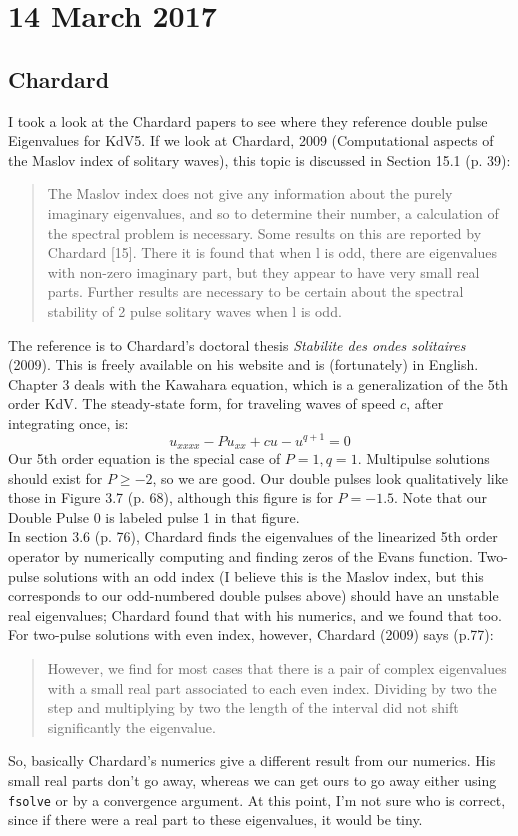 \documentclass[12pt]{article}
\begin{document}
\section*{14 March 2017}
\subsection*{Chardard}
I took a look at the Chardard papers to see where they reference double pulse Eigenvalues for KdV5. If we look at Chardard, 2009 (Computational aspects of the Maslov index of solitary waves), this topic is discussed in Section 15.1 (p. 39):
\begin{quote}
The Maslov index does not give any information about the purely imaginary eigenvalues, and so to determine their number, a calculation of the spectral problem is necessary. Some results on this are reported by Chardard [15]. There it is found that when l is odd, there are eigenvalues with non-zero imaginary part, but they appear to have very small real parts. Further results are necessary to be certain about the spectral stability of 2 pulse solitary waves when l is odd.
\end{quote}
The reference is to Chardard's doctoral thesis \textit{Stabilite des ondes solitaires} (2009). This is freely available on his website and is (fortunately) in English. Chapter 3 deals with the Kawahara equation, which is a generalization of the 5th order KdV. The steady-state form, for traveling waves of speed $c$, after integrating once, is:
\[
u_{xxxx} - Pu_{xx} + cu - u^{q+1} = 0
\]
Our 5th order equation is the special case of $P =1, q = 1$. Multipulse solutions should exist for $P \geq -2$, so we are good. Our double pulses look qualitatively like those in Figure 3.7 (p. 68), although this figure is for $P = -1.5$. Note that our Double Pulse 0 is labeled pulse 1 in that figure.\\

In section 3.6 (p. 76), Chardard finds the eigenvalues of the linearized 5th order operator by numerically computing and finding zeros of the Evans function. Two-pulse solutions with an odd index (I believe this is the Maslov index, but this corresponds to our odd-numbered double pulses above) should have an unstable real eigenvalues; Chardard found that with his numerics, and we found that too. For two-pulse solutions with even index, however, Chardard (2009) says (p.77):
\begin{quote}
However, we find for most cases that there is a pair of complex eigenvalues with a small real
part associated to each even index. Dividing by two the step and multiplying by two the length
of the interval did not shift significantly the eigenvalue.
\end{quote}
So, basically Chardard's numerics give a different result from our numerics. His small real parts don't go away, whereas we can get ours to go away either using \texttt{fsolve} or by a convergence argument. At this point, I'm not sure who is correct, since if there were a real part to these eigenvalues, it would be tiny.
\end{document}
